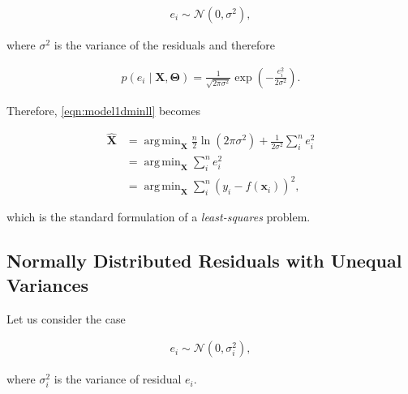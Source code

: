 \documentclass[12pt]{article}
\DeclareMathOperator*{\argmin}{arg\,min}
\begin{document}
      \begin{equation}\label{eqn:model1dnormresidualssim}
        \begin{aligned}
        e_i \sim \mathcal{N}(0, \sigma^2),
        \end{aligned}
      \end{equation}

      \noindent where $\sigma^2$ is the variance of the residuals and therefore

      \begin{equation}\label{eqn:model1dnormresidualspdf}
        \begin{aligned}
        p(e_i\mid\mathbf{X},\boldsymbol{\Theta}) = \frac{1}{\sqrt{2\pi\sigma^2}}
          \exp(-\frac{e_i^2}{2\sigma^2}).
        \end{aligned}
      \end{equation}

      Therefore, \eqref{eqn:model1dminll} becomes

      \begin{equation}\label{eqn:model1dminllnorm}
        \begin{aligned}
        \mathbf{\hat{X}} &=
          \argmin_{\mathbf{X}}\frac{n}{2}\ln(2\pi\sigma^2) +
          \frac{1}{2\sigma^2}\sum_i^n e_i^2 \\&=
        \argmin_{\mathbf{X}}\sum_i^n e_i^2 \\&=
        \argmin_{\mathbf{X}}\sum_i^n (y_i-f(\mathbf{x}_i))^2,
        \end{aligned}
      \end{equation}

      \noindent which is the standard formulation of a \emph{least-squares}
      problem.

    \subsection{Normally Distributed Residuals with Unequal Variances}

      Let us consider the case

      \begin{equation}\label{eqn:model1dnormresidualssim2}
        \begin{aligned}
        e_i \sim \mathcal{N}(0, \sigma_i^2),
        \end{aligned}
      \end{equation}

      \noindent where $\sigma_i^2$ is the variance of residual $e_i$.
\end{document}
